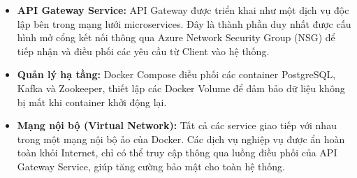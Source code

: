 \begin{itemize}
    \item \textbf{API Gateway Service:} API Gateway được triển khai như một dịch vụ độc lập bên trong mạng lưới microservices. Đây là thành phần duy nhất được cấu hình mở cổng kết nối thông qua Azure Network Security Group (NSG) để tiếp nhận và điều phối các yêu cầu từ Client vào hệ thống.
    \item \textbf{Quản lý hạ tầng:} Docker Compose điều phối các container PostgreSQL, Kafka và Zookeeper, thiết lập các Docker Volume để đảm bảo dữ liệu không bị mất khi container khởi động lại.
    \item \textbf{Mạng nội bộ (Virtual Network):} Tất cả các service giao tiếp với nhau trong một mạng nội bộ ảo của Docker. Các dịch vụ nghiệp vụ được ẩn hoàn toàn khỏi Internet, chỉ có thể truy cập thông qua luồng điều phối của API Gateway Service, giúp tăng cường bảo mật cho toàn hệ thống.
\end{itemize}

